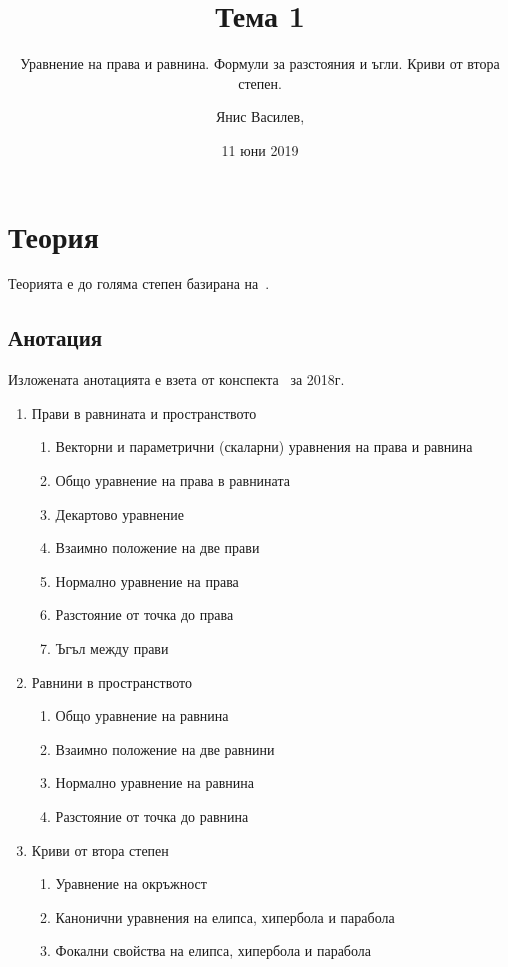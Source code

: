 \documentclass[numbers=endperiod, bibliography=totocnumbered]{scrartcl}
\title{Тема 1}
\subtitle{Уравнение на права и равнина. Формули за разстояния и ъгли. Криви от втора степен.}
\author{Янис Василев, \Email{ianis@ivasilev.net}}
\date{11 юни 2019}
\begin{document}
\maketitle

\section{Теория}

Теорията е до голяма степен базирана на~\cite{Notes}.

\subsection{Анотация}

Изложената анотацията е взета от конспекта~\cite{Syllabus} за 2018г.

\begin{enumerate}
  \item Прави в равнината и пространството
  \begin{enumerate}
    \item Векторни и параметрични (скаларни) уравнения на права и равнина
    \item Общо уравнение на права в равнината
    \item Декартово уравнение
    \item Взаимно положение на две прави
    \item Нормално уравнение на права
    \item Разстояние от точка до права
    \item Ъгъл между прави
  \end{enumerate}

  \item Равнини в пространството
  \begin{enumerate}
    \item Общо уравнение на равнина
    \item Взаимно положение на две равнини
    \item Нормално уравнение на равнина
    \item Разстояние от точка до равнина
  \end{enumerate}

  \item Криви от втора степен
  \begin{enumerate}
    \item Уравнение на окръжност
    \item Канонични уравнения на елипса, хипербола и парабола
    \item Фокални свойства на елипса, хипербола и парабола
  \end{enumerate}
\end{enumerate}
\end{document}
